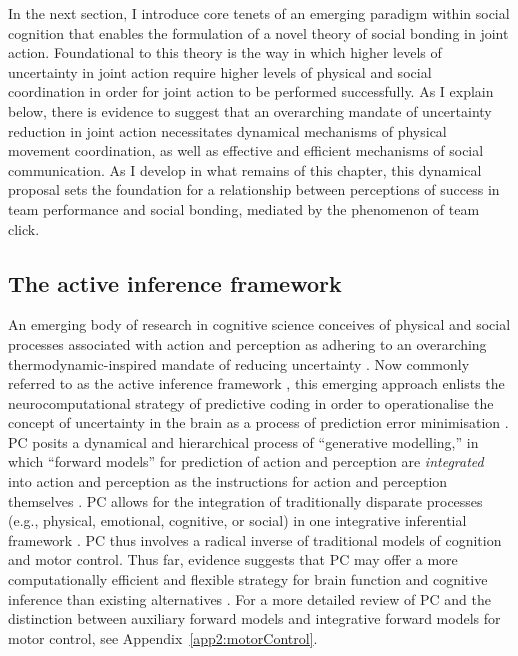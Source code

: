 \begin{CJK}{UTF8}{gbsn}
In the next section, I introduce core tenets of an emerging paradigm within social cognition that enables the formulation of a novel theory of social bonding in joint action. Foundational to this theory is the way in which higher levels of uncertainty in joint action require higher levels of physical and social coordination in order for joint action to be performed successfully.  As I explain below, there is evidence to suggest that an overarching mandate of uncertainty reduction in joint action necessitates dynamical mechanisms of physical movement coordination, as well as effective and efficient mechanisms of social communication.  As I develop in what remains of this chapter, this dynamical proposal sets the foundation for a relationship between perceptions of success in team performance and social bonding, mediated by the phenomenon of team click.


\subsection{The active inference framework\label{sect:AIF}}
An emerging body of research in cognitive science conceives of physical and social processes associated with action and perception as adhering to an overarching thermodynamic-inspired mandate of reducing uncertainty \citep[referred to as variational or information-theoretic ``free energy''; see][]{Friston2015}.  Now commonly referred to as the active inference framework \citep[hereafter AIF; see][]{Friston2006,Friston2010,Clark2015,Linson2018}, this emerging approach enlists the neurocomputational strategy of predictive coding \citep[hereafter PC; see][]{Rao1999} in order to operationalise the concept of uncertainty in the brain as a process of prediction error minimisation \citep{Clark2013}.  PC posits a dynamical and hierarchical process of ``generative modelling,'' in which ``forward models'' for prediction of action and perception are \textit{integrated} into action and perception as the instructions for action and perception themselves \citep[rather than being auxiliary to action and perception;][]{Pickering2014}.  PC allows for the integration of traditionally disparate processes (e.g., physical, emotional, cognitive, or social) in one integrative inferential framework \citep{Clark2015}.  PC thus involves a radical inverse of traditional models of cognition and motor control. Thus far, evidence suggests that PC may offer a more computationally efficient and flexible strategy for brain function and cognitive inference than existing alternatives \citep{Pickering2014,Clark2015a}.  For a more detailed review of PC and the distinction between auxiliary forward models and integrative forward models for motor control, see Appendix~\ref{app2:motorControl}.


\end{CJK}
